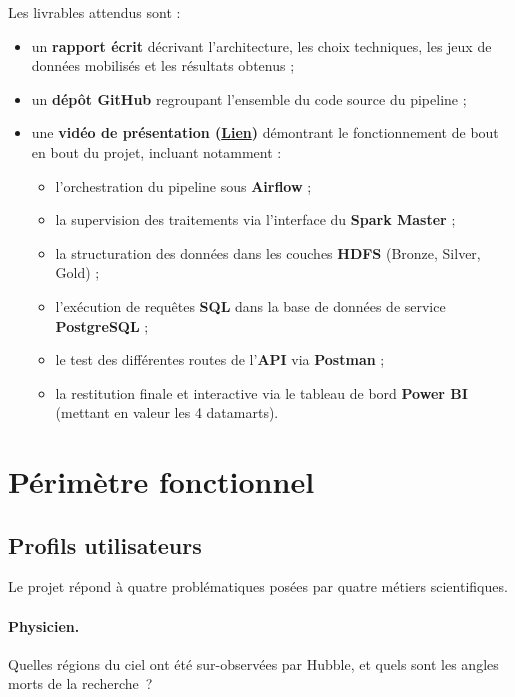 \documentclass[11pt,a4paper]{article}
\begin{document}
Les livrables attendus sont :

\begin{itemize}
    \item un \textbf{rapport écrit} décrivant l'architecture, les choix techniques, les jeux de données mobilisés et les résultats obtenus ;
    \item un \textbf{dépôt GitHub} regroupant l'ensemble du code source du pipeline ;
    \item une \textbf{vidéo de présentation (\href{https://youtu.be/aL-oo-nYbsM}{Lien})} démontrant le fonctionnement de bout en bout du projet, incluant notamment :
    \begin{itemize}
        \item l'orchestration du pipeline sous \textbf{Airflow} ;
        \item la supervision des traitements via l'interface du \textbf{Spark Master} ;
        \item la structuration des données dans les couches \textbf{HDFS} (Bronze, Silver, Gold) ;
        \item l'exécution de requêtes \textbf{SQL} dans la base de données de service \textbf{PostgreSQL} ;
        \item le test des différentes routes de l'\textbf{API} via \textbf{Postman} ;
        \item la restitution finale et interactive via le tableau de bord \textbf{Power BI} (mettant en valeur les 4 datamarts).
    \end{itemize}
\end{itemize}

\newpage
\section{Périmètre fonctionnel}

\subsection{Profils utilisateurs}

Le projet répond à quatre problématiques posées par quatre métiers scientifiques.

\paragraph{Physicien.} Quelles régions du ciel ont été sur-observées par Hubble, et quels sont les angles morts de la recherche~?
\end{document}
